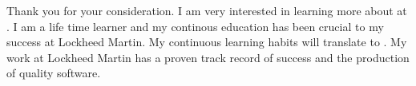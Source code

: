 




Thank you for your consideration. I am very interested in learning more about \position at \company.
I am a life time learner and my continous education has been crucial to my success at Lockheed Martin. My continuous learning habits will translate to \company.
My work at Lockheed Martin has a proven track record of success and the production of quality software. 
